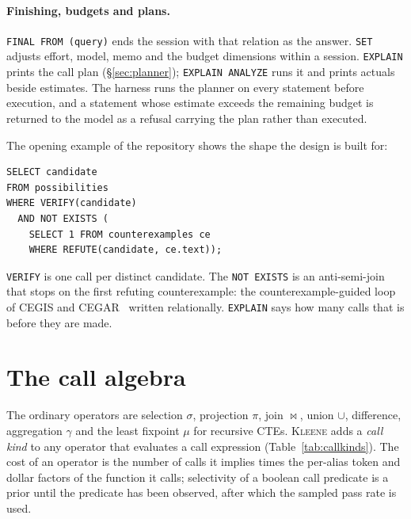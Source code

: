 \documentclass[11pt,a4paper]{article}
\newcommand{\kleene}{\textsc{Kleene}}
\newcommand{\code}[1]{\texttt{#1}}
\begin{document}
\paragraph{Finishing, budgets and plans.} \code{FINAL FROM (query)} ends the
session with that relation as the answer. \code{SET} adjusts effort, model, memo
and the budget dimensions within a session. \code{EXPLAIN} prints the call plan
(\S\ref{sec:planner}); \code{EXPLAIN ANALYZE} runs it and prints actuals beside
estimates. The harness runs the planner on every statement before execution,
and a statement whose estimate exceeds the remaining budget is returned to the
model as a refusal carrying the plan rather than executed.

The opening example of the repository shows the shape the design is built for:

\begin{lstlisting}
SELECT candidate
FROM possibilities
WHERE VERIFY(candidate)
  AND NOT EXISTS (
    SELECT 1 FROM counterexamples ce
    WHERE REFUTE(candidate, ce.text));
\end{lstlisting}

\code{VERIFY} is one call per distinct candidate. The \code{NOT EXISTS} is an
anti-semi-join that stops on the first refuting counterexample: the
counterexample-guided loop of CEGIS and CEGAR~\citep{solarlezama2006combinatorial,
clarke2000cegar} written relationally. \code{EXPLAIN} says how many calls that
is before they are made.

\section{The call algebra}
\label{sec:algebra}

The ordinary operators are selection $\sigma$, projection $\pi$, join
$\bowtie$, union $\cup$, difference, aggregation $\gamma$ and the least fixpoint
$\mu$ for recursive CTEs. \kleene{} adds a \emph{call kind} to any operator that
evaluates a call expression (Table~\ref{tab:callkinds}). The cost of an operator
is the number of calls it implies times the per-alias token and dollar factors
of the function it calls; selectivity of a boolean call predicate is a prior
until the predicate has been observed, after which the sampled pass rate is
used.
\end{document}
